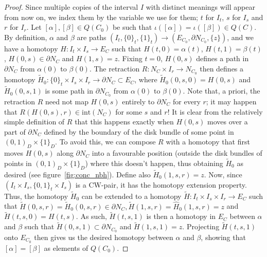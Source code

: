 \documentclass[10pt,a4paper]{amsart}
\begin{document}
\begin{proof}
	Since multiple copies of the interval $I$ with distinct meanings will appear from now on, we index them by the variable we use for them; $t$ for $I_t$, $s$ for $I_s$ and $r$ for $I_r$.
	Let $[\alpha], [\beta] \in Q(C_0)$ be such that $\iota([\alpha]) = \iota([\beta]) \in Q(C)$. By definition, $\alpha$ and $\beta$ are paths 
	$(I_t, \{0\}_t, \{1\}_t) \to (E_{C_0}, \partial N_{C_0}, \{z\})$, and we have a homotopy $H\colon I_t \times I_s \to E_{C}$ such that $H(t,0) = \alpha(t)$, $H(t,1) = \beta(t)$,
	$H(0,s) \in \partial N_C$ and $H(1,s) = z$.
	Fixing $t=0$, $H(0,s)$ defines a path in $\partial N_{C}$ from $\alpha(0)$ to $\beta(0)$. The retraction $R \colon N_C \times I_r \to N_{C_0}$ then defines 
	a homotopy $\widetilde{H}_0\colon \{0\}_t \times I_s \times I_r \to \partial N_{C} \subset E_C$,
	where $\widetilde{H}_0(0, s, 0) =  H(0,s)$ and $\widetilde{H}_0(0,s,1)$ is some path in $\partial N_{C_0}$ from $\alpha(0)$ to $\beta(0)$.
	Note that, a priori, the retraction $R$ need not map $H(0,s)$ entirely to $\partial N_C$ for every $r$; it may happen that $R(H(0,s),r) \in \text{int}(N_C)$ for some $s$ and $r$!
	It is clear from the relatively simple definition of $R$ that this happens exactly when $H(0,s)$ moves over a part of $\partial N_C$ defined by the boundary of the disk bundle of some point in $(0,1)_D \times \{1\}_D$.
	To avoid this, we can compose $R$ with a homotopy that first moves $H(0,s)$ along $\partial N_C$ 
	into a favourable position (outside the disk bundles of points in $(0,1)_D \times \{1\}_D$) where this doesn't happen, thus obtaining $\widetilde{H}_0$ as desired
	(see figure~\ref{fig:conc_nbh}).
	Define also $\widetilde{H}_0(1,s,r) = z$.
	Now, since $(I_t \times I_s, \{0,1\}_t \times I_s )$ is a CW-pair, it has the homotopy extension property. 
	Thus, the homotopy $\widetilde{H}_0$ can be
	extended to a homotopy $\widetilde{H}\colon I_t \times I_s \times I_r \to E_C$ such that 
	$\widetilde{H}(0,s,r) = \widetilde{H}_0(0,s,r) \in  \partial N_C, \widetilde{H}(1,s,r) = \widehat{H}_0(1,s,r) = z$ and $\widetilde{H}(t,s,0) = H(t,s)$.
	As such, $\widetilde{H}(t,s,1)$ is then a homotopy in $E_C$ between $\alpha$ and $\beta$ such that $\widetilde{H}(0,s,1) \subset \partial N_{C_0}$ and $\widetilde{H}(1,s,1) = z$.
	Projecting $\widetilde{H}(t,s,1)$ onto $E_{C_0}$ then gives us the desired homotopy between $\alpha$ and $\beta$,
	showing that $[\alpha] = [\beta]$ as elements of $Q(C_0)$.
\end{proof}
\end{document}
